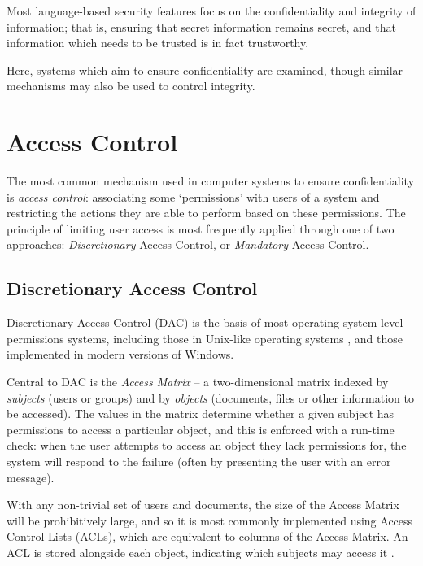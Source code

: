 Most language-based security features focus on the confidentiality and integrity of information; that is, ensuring that secret information remains secret, and that information which needs to be trusted is in fact trustworthy.

Here, systems which aim to ensure confidentiality are examined, though similar mechanisms may also be used to control integrity.

\section{Access Control}

The most common mechanism used in computer systems to ensure confidentiality is \textit{access control}: associating some `permissions' with users of a system and restricting the actions they are able to perform based on these permissions. The principle of limiting user access is most frequently applied through one of two approaches: \textit{Discretionary} Access Control, or \textit{Mandatory} Access Control.

\subsection{Discretionary Access Control} \label{theory_dac_def}

Discretionary Access Control (DAC) is the basis of most operating system-level permissions systems, including those in Unix-like operating systems \cite{sandhu1996role}, and those implemented in modern versions of Windows.

Central to DAC is the \textit{Access Matrix} \cite{sandhu1994access} -- a two-dimensional matrix indexed by \textit{subjects} (users or groups) and by \textit{objects} (documents, files or other information to be accessed). The values in the matrix determine whether a given subject has permissions to access a particular object, and this is enforced with a run-time check: when the user attempts to access an object they lack permissions for, the system will respond to the failure (often by presenting the user with an error message).

With any non-trivial set of users and documents, the size of the Access Matrix will be prohibitively large, and so it is most commonly implemented using Access Control Lists (ACLs), which are equivalent to columns of the Access Matrix. An ACL is stored alongside each object, indicating which subjects may access it \cite{sandhu1994access}.

